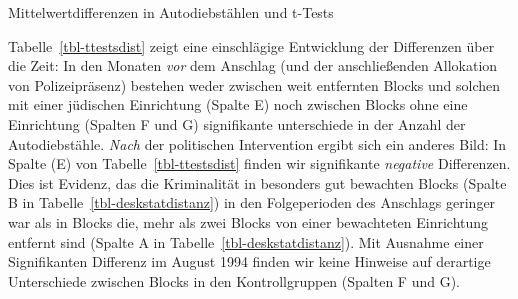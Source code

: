 \documentclass[
  a4paper,
  DIV=11,
  oneside]{scrreprt}
\begin{document}
\begin{table}

\caption{\label{tbl-ttestsdist}Mittelwertdifferenzen in Autodiebstählen
und t-Tests}


\end{table}%

Tabelle~\ref{tbl-ttestsdist} zeigt eine einschlägige Entwicklung der
Differenzen über die Zeit: In den Monaten \emph{vor} dem Anschlag (und
der anschließenden Allokation von Polizeipräsenz) bestehen weder
zwischen weit entfernten Blocks und solchen mit einer jüdischen
Einrichtung (Spalte E) noch zwischen Blocks ohne eine Einrichtung
(Spalten F und G) signifikante unterschiede in der Anzahl der
Autodiebstähle. \emph{Nach} der politischen Intervention ergibt sich ein
anderes Bild: In Spalte (E) von Tabelle~\ref{tbl-ttestsdist} finden wir
signifikante \emph{negative} Differenzen. Dies ist Evidenz, das die
Kriminalität in besonders gut bewachten Blocks (Spalte B in
Tabelle~\ref{tbl-deskstatdistanz}) in den Folgeperioden des Anschlags
geringer war als in Blocks die, mehr als zwei Blocks von einer
bewachteten Einrichtung entfernt sind (Spalte A in
Tabelle~\ref{tbl-deskstatdistanz}). Mit Ausnahme einer Signifikanten
Differenz im August 1994 finden wir keine Hinweise auf derartige
Unterschiede zwischen Blocks in den Kontrollgruppen (Spalten F und G).
\end{document}
